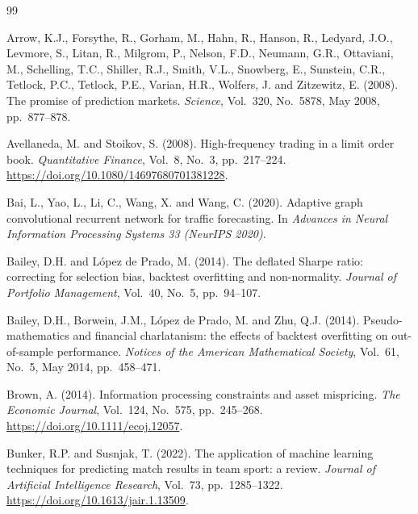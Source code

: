 \documentclass[12pt,a4paper,oneside]{report}
\begin{document}
\singlespacing
\renewcommand{\bibname}{References}
\begin{thebibliography}{99}
\setlength{\itemsep}{4pt}

Arrow, K.J., Forsythe, R., Gorham, M., Hahn, R., Hanson, R., Ledyard, J.O.,
Levmore, S., Litan, R., Milgrom, P., Nelson, F.D., Neumann, G.R., Ottaviani, M.,
Schelling, T.C., Shiller, R.J., Smith, V.L., Snowberg, E., Sunstein, C.R.,
Tetlock, P.C., Tetlock, P.E., Varian, H.R., Wolfers, J. and Zitzewitz, E. (2008).
The promise of prediction markets. \textit{Science}, Vol.~320, No.~5878,
May 2008, pp.~877--878.

Avellaneda, M. and Stoikov, S. (2008). High-frequency trading in a limit order
book. \textit{Quantitative Finance}, Vol.~8, No.~3, pp.~217--224.
\url{https://doi.org/10.1080/14697680701381228}.

Bai, L., Yao, L., Li, C., Wang, X. and Wang, C. (2020). Adaptive graph
convolutional recurrent network for traffic forecasting. In
\textit{Advances in Neural Information Processing Systems 33 (NeurIPS 2020)}.

Bailey, D.H. and L\'opez de Prado, M. (2014). The deflated Sharpe ratio: correcting
for selection bias, backtest overfitting and non-normality. \textit{Journal of
Portfolio Management}, Vol.~40, No.~5, pp.~94--107.

Bailey, D.H., Borwein, J.M., L\'opez de Prado, M. and Zhu, Q.J. (2014).
Pseudo-mathematics and financial charlatanism: the effects of backtest
overfitting on out-of-sample performance. \textit{Notices of the American
Mathematical Society}, Vol.~61, No.~5, May 2014, pp.~458--471.

Brown, A. (2014). Information processing constraints and asset mispricing.
\textit{The Economic Journal}, Vol.~124, No.~575, pp.~245--268.
\url{https://doi.org/10.1111/ecoj.12057}.

Bunker, R.P. and Susnjak, T. (2022). The application of machine learning
techniques for predicting match results in team sport: a review. \textit{Journal of
Artificial Intelligence Research}, Vol.~73, pp.~1285--1322.
\url{https://doi.org/10.1613/jair.1.13509}.


\end{thebibliography}
\end{document}
